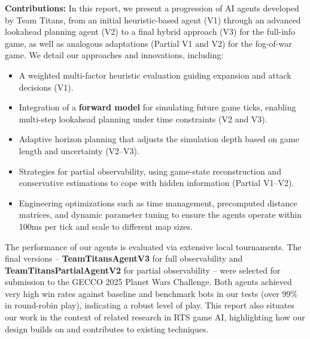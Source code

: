 \documentclass[conference]{IEEEtran}
\begin{document}
\textbf{Contributions:} In this report, we present a progression of AI agents developed by Team Titans, from an initial heuristic-based agent (V1) through an advanced lookahead planning agent (V2) to a final hybrid approach (V3) for the full-info game, as well as analogous adaptations (Partial V1 and V2) for the fog-of-war game. We detail our approaches and innovations, including:

\begin{itemize}
\item A weighted multi-factor heuristic evaluation guiding expansion and attack decisions (V1).
\item Integration of a \textbf{forward model} for simulating future game ticks, enabling multi-step lookahead planning under time constraints (V2 and V3).
\item Adaptive horizon planning that adjusts the simulation depth based on game length and uncertainty (V2--V3).
\item Strategies for partial observability, using game-state reconstruction and conservative estimations to cope with hidden information (Partial V1--V2).
\item Engineering optimizations such as time management, precomputed distance matrices, and dynamic parameter tuning to ensure the agents operate within 100ms per tick and scale to different map sizes.
\end{itemize}

The performance of our agents is evaluated via extensive local tournaments. The final versions -- \textbf{TeamTitansAgentV3} for full observability and \textbf{TeamTitansPartialAgentV2} for partial observability -- were selected for submission to the GECCO 2025 Planet Wars Challenge. Both agents achieved very high win rates against baseline and benchmark bots in our tests (over 99\% in round-robin play), indicating a robust level of play. This report also situates our work in the context of related research in RTS game AI, highlighting how our design builds on and contributes to existing techniques.
\end{document}
